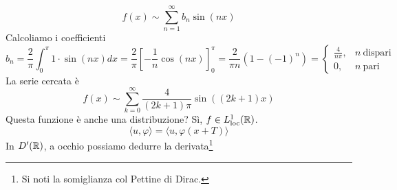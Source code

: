 \Soluzione
\begin{equation*}
f( x) \sim \sum\limits ^{\infty }_{n=1} b_{n}\sin( nx)
\end{equation*}
Calcoliamo i coefficienti
\begin{equation*}
b_{n} =\frac{2}{\pi }\int ^{\pi }_{0} 1\cdotp \sin( nx) dx=\frac{2}{\pi }\left[ -\frac{1}{n}\cos( nx)\right]^{\pi }_{0} =\frac{2}{\pi n}\left( 1-( -1)^{n}\right) =\begin{cases}
\frac{4}{n\pi } , & n\ \text{dispari}\\
0, & n\ \text{pari}
\end{cases}
\end{equation*}
La serie cercata è
\begin{equation*}
f( x) \sim \sum\limits ^{\infty }_{k=0}\frac{4}{( 2k+1) \pi }\sin(( 2k+1) x)
\end{equation*}
Questa funzione è anche una distribuzione? Sì, $f\in L^{1}_{\operatorname{loc}}(\mathbb{R} )$.
\begin{equation*}
\langle u,\varphi \rangle =\langle u,\varphi ( x+T) \rangle 
\end{equation*}
In $D'(\mathbb{R} )$, a occhio possiamo dedurre la derivata\footnote{Si noti la somiglianza col Pettine di Dirac.}



